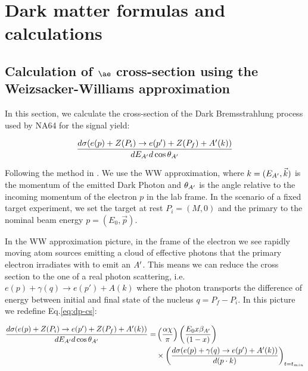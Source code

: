 
\newcommand{\appdira}{appendices/plots/appendixA}

\chapter{Dark matter formulas and calculations} %

\label{AppendixA} %


\section{Calculation of $\ae$ cross-section using the Weizsacker-Williams approximation}
\label{appA:sec:cross-section-wz}

In this section, we calculate the cross-section of the Dark Bremsstrahlung process used by NA64 for the signal yield:

\begin{equation}
  \label{eq:dp-cs}
  \frac{d\sigma(e(p) + Z(P_i) \to e(p') + Z(P_f) + A'(k))}{dE_{A'}d\cos{\theta_{A'}}}
\end{equation}

Following the method in \cite{jdb}. We use the WW approximation, where $k=(E_{A'},\vec{k})$ is the momentum of the emitted Dark Photon and $\theta_{A'}$ is the angle relative to the incoming momentum of the electron $p$ in the lab frame. In the scenario of a fixed target experiment, we set the target at rest $P_i = (M,0)$ and the primary to the nominal beam energy $p = (E_0, \vec{p})$.

In the WW approximation picture, in the frame of the electron we see rapidly moving atom sources emitting a cloud of effective photons that the primary electron irradiates with to emit an $A'$. This means we can reduce the cross section to the one of a real photon scattering, i.e. $e(p) + \gamma(q) \to e(p') + A(k)$ where the photon transports the difference of energy between initial and final state of the nucleus $q = P_f - P_i$. In this picture we redefine Eq.\ref{eq:dp-cs}:

\begin{equation}
  \label{eq:dp-cs-ww}
  \begin{aligned}
    \frac{d\sigma(e(p) + Z(P_i) \to e(p') + Z(P_f) + A'(k))}{dE_{A'}d\cos{\theta_{A'}}} = &\left(\frac{\alpha \chi}{\pi} \right) \left(\frac{E_0 x \beta_{A'}}{(1 - x)} \right) \\
    &\times \left( \frac{d\sigma(e(p) + \gamma(q) \to e(p') + A'(k))}{d(p \cdot k)} \right)_{t = t_{min}}
   \end{aligned}
 \end{equation}

